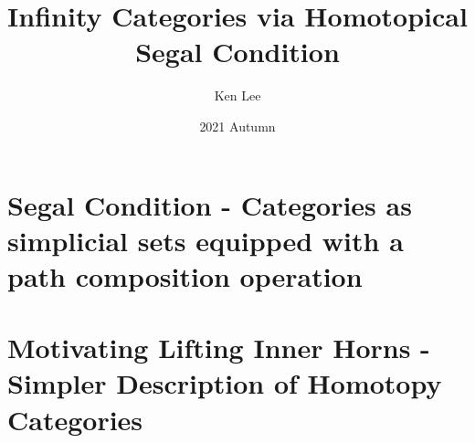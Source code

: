 \documentclass{article}
\begin{document}
\title{Infinity Categories via Homotopical Segal Condition}

\author{Ken Lee}
\date{2021 Autumn}
\maketitle
\tableofcontents

\section{Segal Condition -
  Categories as simplicial sets equipped with a path composition operation}
  
\section{Motivating Lifting Inner Horns - 
  Simpler Description of Homotopy Categories}
  
\end{document}
